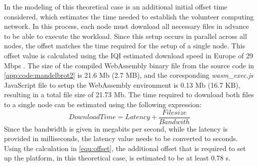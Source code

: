 In the modeling of this theoretical case is an additional initial offset time considered, which estimates the time needed to establish the volunteer computing network. In this process, each node must download all necessary files in advance to be able to execute the workload. Since this setup occurs in parallel across all nodes, the offset matches the time required for the setup of a single node. This offset value is calculated using the \ac{IQI} estimated download speed in Europe of 29 Mbps \cite{backend:latency}. The size of the compiled WebAssembly binary file from the source code in \autoref{app:code:mandelbrot2} is 21.6 Mb (2.7 MB), and the coresponding \emph{wasm\_exec.js} JavaScript file to setup the WebAssembly environment is 0.13 Mb (16.7 KB), resulting in a total file size of 21.73 Mb. The time required to download both files to a single node can be estimated using the following expression:
\begin{equation}
  DownloadTime = Latency + \frac{Filesize}{Bandwith} 
  \label{equ:offset}
\end{equation}
Since the bandwidth is given in megabits per second, while the latency is provided in milliseconds, the latency value needs to be converted to seconds. Using the calculation in \ref{equ:offset}, the additional offset that is required to set up the platform, in this theoretical case, is estimated to be at least 0.78 s.

